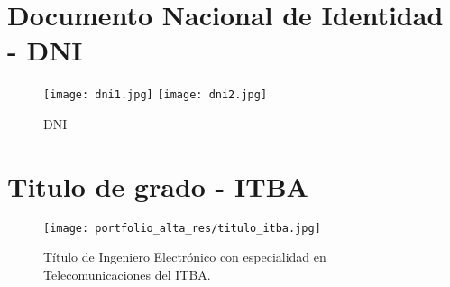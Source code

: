 \break
\section{Documento Nacional de Identidad - DNI}
   \begin{figure}
      \begin{center}
         \texttt{[image: dni1.jpg]}
         \texttt{[image: dni2.jpg]}
      \end{center}
      \caption{DNI}
      \label{fig:dni}
   \end{figure}

\newpage
\mbox{}
\newpage %

\section{Titulo de grado - ITBA}
   \begin{figure}
      \begin{center}
         \texttt{[image: portfolio\_alta\_res/titulo\_itba.jpg]}
      \end{center}
      \caption{Título de Ingeniero Electrónico con especialidad en Telecomunicaciones del ITBA.}
      \label{fig:titulo_itba}
   \end{figure}

